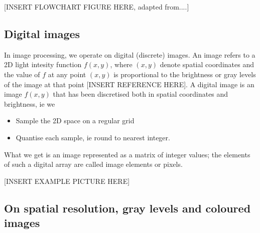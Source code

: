 
[INSERT FLOWCHART FIGURE HERE, adapted from....]


\subsection{Digital images}

In image processing, we operate on digital (discrete) images.
An image refers to a 2D light intesity function \( f(x,y) \), where \( (x,y) \) denote spatial coordinates and the value of \( f \) at any point \( (x,y) \) is proportional to the brightness or gray levels of the image at that point [INSERT REFERENCE HERE].
A digital image is an image \( f(x,y)  \) that has been discretised both in spatial coordinates and brightness, ie we

\begin{itemize}
	\item Sample the 2D space on a regular grid
	\item Quantise each sample, ie round to nearest integer.
\end{itemize}

What we get is an image represented as a matrix of integer values; the elements of such a digital array are called image elements or pixels.


[INSERT EXAMPLE PICTURE HERE]


\subsection{On spatial resolution, gray levels and coloured images}

